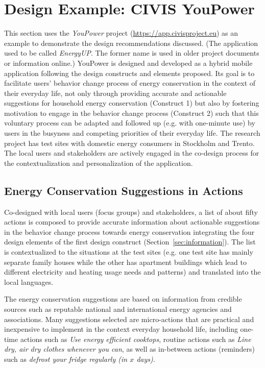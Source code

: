 \documentclass[a4paper]{article}
\begin{document}
\section{Design Example: CIVIS YouPower} 
\label{sec:example}

This section uses the \textit{YouPower} project (\url{https://app.civisproject.eu}) as an example to demonstrate the design recommendations discussed. (The application used to be called \textit{EnergyUP}. The former name is used in older project documents or information online.) YouPower is designed and developed as a hybrid mobile application following the design constructs and elements proposed. Its goal is to facilitate users' behavior change process of energy conservation in the context of their everyday life, not only through providing accurate and actionable suggestions for household energy conservation (Construct 1) but also by fostering motivation to engage in the behavior change process (Construct 2) such that this voluntary process can be adapted and followed up (e.g. with one-minute use) by users in the busyness and competing priorities of their everyday life. The research project has test sites with domestic energy consumers in Stockholm and Trento. The local users and stakeholders are actively engaged in the co-design process for the contextualization and personalization of the application. 


\subsection{Energy Conservation Suggestions in Actions} 
\label{sec:example:suggestions}

Co-designed with local users (focus groups) and stakeholders, a list of about fifty actions is composed to provide accurate information about actionable suggestions in the behavior change process towards energy conservation integrating the four design elements of the first design construct (Section~\ref{sec:information}). The list is contextualized to the situations at the test sites (e.g. one test site has mainly separate family houses while the other has apartment buildings which lead to different electricity and heating usage needs and patterns) and translated into the local languages. 

The energy conservation suggestions are based on information from credible sources such as reputable national and international energy agencies and associations. Many suggestions selected are micro-actions that are practical and inexpensive to implement in the context everyday household life, including one-time actions such as \textit{Use energy efficient cooktops}, routine actions such as \textit{Line dry, air dry clothes whenever you can}, as well as in-between actions (reminders) such as \textit{defrost your fridge regularly (in $x$ days)}. 
\end{document}
